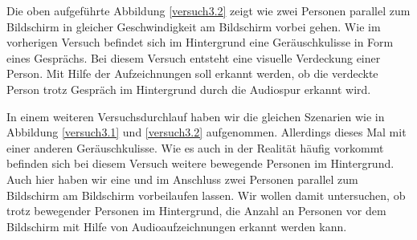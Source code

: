 Die oben aufgeführte Abbildung \ref{versuch3.2} zeigt wie zwei Personen parallel zum Bildschirm in gleicher Geschwindigkeit am Bildschirm vorbei gehen. Wie im vorherigen Versuch befindet sich im Hintergrund eine Geräuschkulisse in Form eines Gesprächs. Bei diesem Versuch entsteht eine visuelle Verdeckung einer Person. Mit Hilfe der Aufzeichnungen soll erkannt werden, ob die verdeckte Person trotz Gespräch im Hintergrund durch die Audiospur erkannt wird. 

In einem weiteren Versuchsdurchlauf haben wir die gleichen Szenarien wie in Abbildung \ref{versuch3.1} und \ref{versuch3.2} aufgenommen. Allerdings dieses Mal mit einer anderen Geräuschkulisse. Wie es auch in der Realität häufig vorkommt befinden sich bei diesem Versuch weitere bewegende Personen im Hintergrund. Auch hier haben wir eine und im Anschluss zwei Personen parallel zum Bildschirm am Bildschirm vorbeilaufen lassen. Wir wollen damit untersuchen, ob trotz bewegender Personen im Hintergrund, die Anzahl an Personen vor dem Bildschirm mit Hilfe von Audioaufzeichnungen erkannt werden kann.
